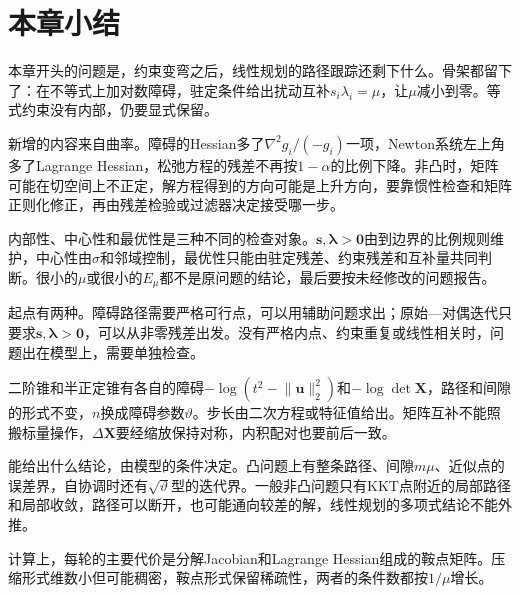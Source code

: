 \section{本章小结}
\label{sec:nlipm-summary}

本章开头的问题是，约束变弯之后，线性规划的路径跟踪还剩下什么。骨架都留下了：在不等式上加对数障碍，驻定条件给出扰动互补$s_i\lambda_i=\mu$，让$\mu$减小到零。等式约束没有内部，仍要显式保留。

新增的内容来自曲率。障碍的Hessian多了$\nabla^2g_i/(-g_i)$一项，Newton系统左上角多了Lagrange Hessian，松弛方程的残差不再按$1-\alpha$的比例下降。非凸时，矩阵可能在切空间上不正定，解方程得到的方向可能是上升方向，要靠惯性检查和矩阵正则化修正，再由残差检验或过滤器决定接受哪一步。

内部性、中心性和最优性是三种不同的检查对象。$\bm{s},\bm{\lambda}>\bm{0}$由到边界的比例规则维护，中心性由$\sigma$和邻域控制，最优性只能由驻定残差、约束残差和互补量共同判断。很小的$\mu$或很小的$E_\mu$都不是原问题的结论，最后要按未经修改的问题报告。

起点有两种。障碍路径需要严格可行点，可以用辅助问题求出；原始—对偶迭代只要求$\bm{s},\bm{\lambda}>\bm{0}$，可以从非零残差出发。没有严格内点、约束重复或线性相关时，问题出在模型上，需要单独检查。

二阶锥和半正定锥有各自的障碍$-\log(t^2-\lVert\bm{u}\rVert_2^2)$和$-\log\det\bm{X}$，路径和间隙的形式不变，$n$换成障碍参数$\vartheta$。步长由二次方程或特征值给出。矩阵互补不能照搬标量操作，$\Delta\bm{X}$要经缩放保持对称，内积配对也要前后一致。

能给出什么结论，由模型的条件决定。凸问题上有整条路径、间隙$m\mu$、近似点的误差界，自协调时还有$\sqrt{\vartheta}$型的迭代界。一般非凸问题只有KKT点附近的局部路径和局部收敛，路径可以断开，也可能通向较差的解，线性规划的多项式结论不能外推。

计算上，每轮的主要代价是分解Jacobian和Lagrange Hessian组成的鞍点矩阵。压缩形式维数小但可能稠密，鞍点形式保留稀疏性，两者的条件数都按$1/\mu$增长。
